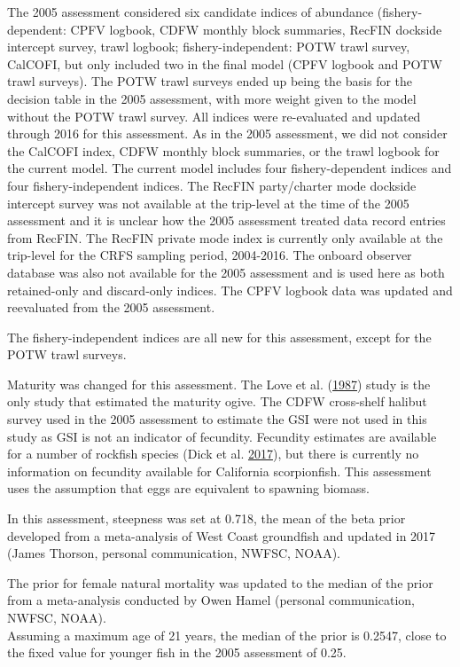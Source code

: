 \documentclass[12pt,]{article}
\begin{document}
The 2005 assessment considered six candidate indices of abundance
(fishery-dependent: CPFV logbook, CDFW monthly block summaries, RecFIN
dockside intercept survey, trawl logbook; fishery-independent: POTW
trawl survey, CalCOFI, but only included two in the final model (CPFV
logbook and POTW trawl surveys). The POTW trawl surveys ended up being
the basis for the decision table in the 2005 assessment, with more
weight given to the model without the POTW trawl survey. All indices
were re-evaluated and updated through 2016 for this assessment. As in
the 2005 assessment, we did not consider the CalCOFI index, CDFW monthly
block summaries, or the trawl logbook for the current model. The current
model includes four fishery-dependent indices and four
fishery-independent indices. The RecFIN party/charter mode dockside
intercept survey was not available at the trip-level at the time of the
2005 assessment and it is unclear how the 2005 assessment treated data
record entries from RecFIN. The RecFIN private mode index is currently
only available at the trip-level for the CRFS sampling period,
2004-2016. The onboard observer database was also not available for the
2005 assessment and is used here as both retained-only and discard-only
indices. The CPFV logbook data was updated and reevaluated from the 2005
assessment.

The fishery-independent indices are all new for this assessment, except
for the POTW trawl surveys.

Maturity was changed for this assessment. The Love et al.
(\protect\hyperlink{ref-Love1987}{1987}) study is the only study that
estimated the maturity ogive. The CDFW cross-shelf halibut survey used
in the 2005 assessment to estimate the GSI were not used in this study
as GSI is not an indicator of fecundity. Fecundity estimates are
available for a number of rockfish species (Dick et al.
\protect\hyperlink{ref-Dick2017}{2017}), but there is currently no
information on fecundity available for California scorpionfish. This
assessment uses the assumption that eggs are equivalent to spawning
biomass.

In this assessment, steepness was set at 0.718, the mean of the beta
prior developed from a meta-analysis of West Coast groundfish and
updated in 2017 (James Thorson, personal communication, NWFSC, NOAA).

The prior for female natural mortality was updated to the median of the
prior from a meta-analysis conducted by Owen Hamel (personal
communication, NWFSC, NOAA).\\
Assuming a maximum age of 21 years, the median of the prior is 0.2547,
close to the fixed value for younger fish in the 2005 assessment of
0.25.
\end{document}
